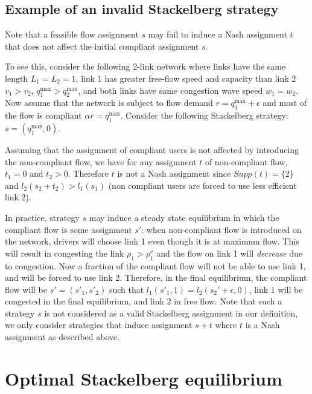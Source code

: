 \subsection{Example of an invalid Stackelberg strategy} Note that a feasible flow assignment $s$ may fail to induce a Nash assignment $t$ that does not affect the initial compliant assignment $s$.

To see this, consider the following 2-link network where links have the same length $L_1 = L_2 = 1$, link 1 has greater free-flow speed and capacity than link $2$ $v_1 > v_2$, $q_1^{\max} > q_2^{\max}$, and both links have same congestion wave speed $w_1 = w_2$.
Now assume that the network is subject to flow demand $r = q_1^{\max} + \epsilon$ and most of the flow is compliant $\alpha r = q_1^{\max}$. Consider the following Stackelberg strategy: $s = (q_1^{\max}, 0)$.

Assuming that the assignment of compliant users is not affected by introducing the non-compliant flow, we have for any assignment $t$ of non-compliant flow, $t_1 = 0$ and $t_2 > 0$. Therefore $t$ is not a Nash assignment since $Supp(t) = \{ 2 \}$ and $l_2(s_2 + t_2) > l_1(s_1)$ (non compliant users are forced to use less efficient link 2).

In practice, strategy $s$ may induce a steady state equilibrium in which the compliant flow is some assignment $s'$: when non-compliant flow is introduced on the network, drivers will choose link 1 even though it is at maximum flow. This will result in congesting the link $\rho_1 > \rho_1^c$ and the flow on link 1 will \emph{decrease} due to congestion. Now a fraction of the compliant flow will not be able to use link 1, and will be forced to use link 2. Therefore, in the final equilibrium, the compliant flow will be $s' = (s'_1, s'_2)$ such that $l_1(s'_1, 1) = l_2(s_2' + \epsilon, 0)$, link 1 will be congested in the final equilibrium, and link 2 in free flow. Note that such a strategy $s$ is not considered as a valid Stackelberg assignment in our definition, we only consider strategies that induce assignment $s + t$ where $t$ is a Nash assignment as described above.









\section{Optimal Stackelberg equilibrium}

